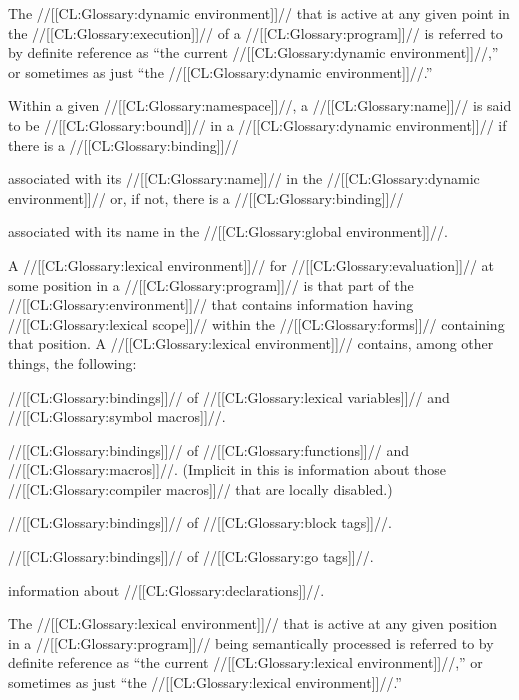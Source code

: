 The //[[CL:Glossary:dynamic environment]]// that is active at any given point  in the //[[CL:Glossary:execution]]// of a //[[CL:Glossary:program]]// is referred to by  definite reference as ``the current //[[CL:Glossary:dynamic environment]]//,'' or sometimes as just ``the //[[CL:Glossary:dynamic environment]]//.''

Within a given //[[CL:Glossary:namespace]]//, a //[[CL:Glossary:name]]// is said to be //[[CL:Glossary:bound]]// in a //[[CL:Glossary:dynamic environment]]// if there is a //[[CL:Glossary:binding]]// 

associated with its //[[CL:Glossary:name]]// in the //[[CL:Glossary:dynamic environment]]//  or, if not, there is a //[[CL:Glossary:binding]]// 

associated with its name in the //[[CL:Glossary:global environment]]//.

\endsubsubsection%


A //[[CL:Glossary:lexical environment]]// for //[[CL:Glossary:evaluation]]// at some position in a //[[CL:Glossary:program]]// is that part of the //[[CL:Glossary:environment]]// that contains information having  //[[CL:Glossary:lexical scope]]// within the //[[CL:Glossary:forms]]// containing that position. A //[[CL:Glossary:lexical environment]]// contains, among other things, the following:

\beginlist \item{\bull} //[[CL:Glossary:bindings]]// of //[[CL:Glossary:lexical variables]]// and //[[CL:Glossary:symbol macros]]//. \item{\bull} //[[CL:Glossary:bindings]]// of //[[CL:Glossary:functions]]// and //[[CL:Glossary:macros]]//.
             (Implicit in this is information about those //[[CL:Glossary:compiler macros]]//  	      that are locally disabled.)

\item{\bull} //[[CL:Glossary:bindings]]// of //[[CL:Glossary:block tags]]//. \item{\bull} //[[CL:Glossary:bindings]]// of //[[CL:Glossary:go tags]]//. \item{\bull} information about //[[CL:Glossary:declarations]]//. \endlist

The //[[CL:Glossary:lexical environment]]// that is active at any given position in a //[[CL:Glossary:program]]// being semantically processed is referred to by definite reference as ``the current //[[CL:Glossary:lexical environment]]//,'' or sometimes as just ``the //[[CL:Glossary:lexical environment]]//.''  

